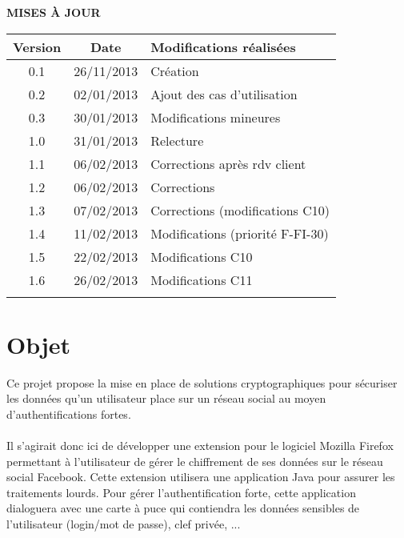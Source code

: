 \documentclass[a4paper,11pt,french]{article}
\begin{document}
\makeFirstPage
\clearpage

\vspace*{1cm}
\begin{center}
\textbf{\huge{MISES À JOUR}}\\
\vspace*{3cm}
	\begin{tabularx}{16cm}{|c|c|X|}
	\hline
	\bfseries{Version} & \bfseries{Date} & \bfseries{Modifications réalisées}\\
	\hline
	0.1 & 26/11/2013 & Création\\
	\hline
    0.2 & 02/01/2013 & Ajout des cas d'utilisation\\
	\hline
    0.3 & 30/01/2013 & Modifications mineures\\
	\hline
    1.0 & 31/01/2013 & Relecture \\
	\hline
    1.1 & 06/02/2013 & Corrections après rdv client \\
	\hline
    1.2 & 06/02/2013 & Corrections \\
	\hline
    1.3 & 07/02/2013 & Corrections (modifications C10) \\
	\hline
    1.4 & 11/02/2013 & Modifications (priorité F-FI-30) \\
	\hline
    1.5 & 22/02/2013 & Modifications C10 \\
	\hline
    1.6 & 26/02/2013 & Modifications C11 \\
	\hline
	&&\\
	\hline
	\end{tabularx}
\end{center}

\clearpage
\tableofcontents
\clearpage

\section{Objet}
\renewcommand\labelitemi{\textbullet} %
\renewcommand\labelitemii{$\circ$} %
Ce projet propose la mise en place de solutions cryptographiques pour 
sécuriser les données qu’un utilisateur place sur un réseau social au moyen 
d’authentifications fortes.

\paragraph{}
Il s’agirait donc ici de développer une extension pour le logiciel Mozilla 
Firefox permettant à l’utilisateur de gérer le chiffrement de ses données sur 
le réseau social Facebook. Cette extension utilisera
une application Java pour assurer les traitements lourds. Pour gérer 
l’authentification forte, cette application dialoguera avec une carte à puce 
qui contiendra les données sensibles de l’utilisateur (login/mot de passe), 
clef privée, ...
\end{document}
